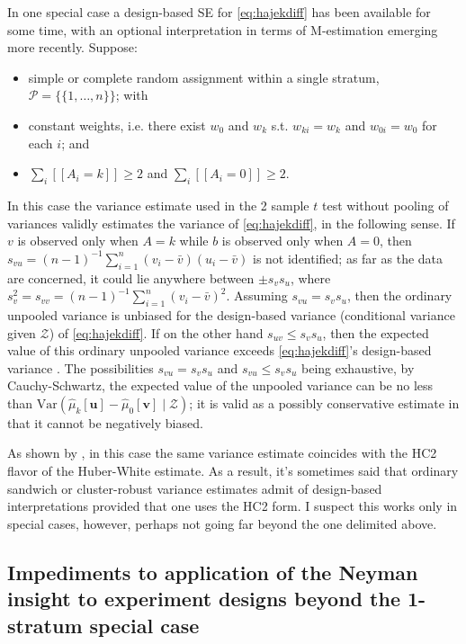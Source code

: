 In one special case a design-based SE for \eqref{eq:hajekdiff} has been available for some time, with an optional interpretation in terms of M-estimation emerging more recently.  Suppose:
\begin{itemize}
\item  simple or complete random assignment within a single
stratum, \(\mathcal{P} = \{\{1,\ldots,n\}\}\); with
\item constant weights, i.e. there exist $w_0$ and $w_k$ s.t. $w_{ki}= w_k$ and $w_{0i}= w_0$ for each $i$; and
\item  \(\sum_i [\![A_i = k]\!]\geq 2\) and \(\sum_i [\![A_i = 0]\!] \geq 2\).
\end{itemize}
In this case the variance estimate used
in the 2 sample \(t\) test without pooling of variances validly
estimates the variance of \eqref{eq:hajekdiff}, in the following sense. If \(v\) is observed
only when \(A=k\) while \(b\) is observed only when \(A=0\), then
\(s_{vu} = (n-1)^{-1} \sum_{i=1}^n (v_i - \bar v)(u_i - \bar v)\) is
not identified; as far as the data are concerned, it could lie anywhere
between \(\pm s_{v} s_{u}\), where
\(s_{v}^2 = s_{vv} = (n-1)^{-1} \sum_{i=1}^n (v_i - \bar v)^2\). Assuming
\(s_{vu} = s_{v}s_{u}\), then the ordinary unpooled variance is unbiased for
the design-based variance (conditional variance given \(\mathcal{Z}\))
of \eqref{eq:hajekdiff}. If on the other hand \(s_{uv} \leq s_{v}s_{u}\), then the expected value of this ordinary
unpooled variance exceeds \eqref{eq:hajekdiff}'s design-based variance
\citep[][A32--34]{neyman:1990,freedman:purv:pisa:1998}. The
possibilities \(s_{vu} = s_{v}s_{u}\) and \(s_{vu} \leq s_{v}s_{u}\) being
exhaustive, by Cauchy-Schwartz, the expected value of the unpooled
variance can be no less than $\mathrm{Var}(\hat{\mu}_k[\mathbf{u}] -
\hat{\mu}_0[\mathbf{v}] \mid \mathcal{Z})$; it is valid as a possibly
conservative estimate in that it cannot be negatively biased.

As shown by \citet{samiiAronow2012HC2equivNeyman}, in
this case the same variance estimate coincides with the HC2 flavor of
the Huber-White estimate.  As a result, it's sometimes said that
ordinary sandwich or cluster-robust variance estimates admit of
design-based interpretations provided that one uses the HC2
form. I suspect this works only in special cases, however, perhaps not going far
beyond the one delimited above. 

\subsection*{Impediments to application of the Neyman insight to
  experiment designs beyond the 1-stratum special case}


